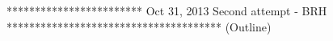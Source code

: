 % 

************************ Oct 31, 2013 Second attempt - BRH **************************************
(Outline)


